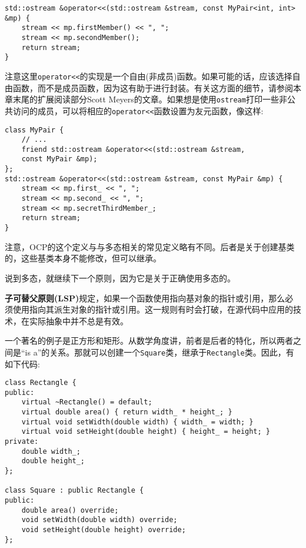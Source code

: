 \begin{lstlisting}[style=styleCXX]
std::ostream &operator<<(std::ostream &stream, const MyPair<int, int>
&mp) {
	stream << mp.firstMember() << ", ";
	stream << mp.secondMember();
	return stream;
}

\end{lstlisting}

注意这里\texttt{operator<<}的实现是一个自由(非成员)函数。如果可能的话，应该选择自由函数，而不是成员函数，因为这有助于进行封装。有关这方面的细节，请参阅本章末尾的扩展阅读部分Scott Meyers的文章。如果想是使用\texttt{ostream}打印一些非公共访问的成员，可以将相应的\texttt{operator<<}函数设置为友元函数，像这样:


\begin{lstlisting}[style=styleCXX]
class MyPair {
	// ...
	friend std::ostream &operator<<(std::ostream &stream,
	const MyPair &mp);
};
std::ostream &operator<<(std::ostream &stream, const MyPair &mp) {
	stream << mp.first_ << ", ";
	stream << mp.second_ << ", ";
	stream << mp.secretThirdMember_;
	return stream;
}
\end{lstlisting}

注意，OCP的这个定义与与多态相关的常见定义略有不同。后者是关于创建基类的，这些基类本身不能修改，但可以继承。

说到多态，就继续下一个原则，因为它是关于正确使用多态的。



\textbf{子可替父原则(LSP)}规定，如果一个函数使用指向基对象的指针或引用，那么必须使用指向其派生对象的指针或引用。这一规则有时会打破，在源代码中应用的技术，在实际抽象中并不总是有效。

一个著名的例子是正方形和矩形。从数学角度讲，前者是后者的特化，所以两者之间是“is a”的关系。那就可以创建一个\texttt{Square}类，继承于\texttt{Rectangle}类。因此，有如下代码:

\begin{lstlisting}[style=styleCXX]
class Rectangle {
public:
	virtual ~Rectangle() = default;
	virtual double area() { return width_ * height_; }
	virtual void setWidth(double width) { width_ = width; }
	virtual void setHeight(double height) { height_ = height; }
private:
	double width_;
	double height_;
};

class Square : public Rectangle {
public:
	double area() override;
	void setWidth(double width) override;
	void setHeight(double height) override;
};

\end{lstlisting}

